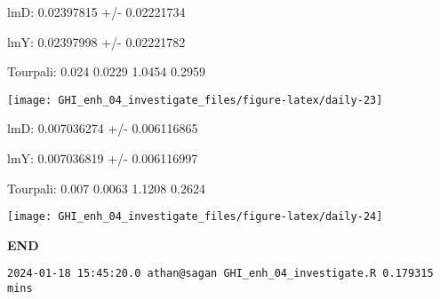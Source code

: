 \documentclass[
  10pt,
  a4paper,oneside]{article}
\begin{document}
lmD: 0.02397815 +/- 0.02221734

lmY: 0.02397998 +/- 0.02221782

Tourpali: 0.024 0.0229 1.0454 0.2959

\begin{center}\texttt{[image: GHI\_enh\_04\_investigate\_files/figure-latex/daily-23]} \end{center}

lmD: 0.007036274 +/- 0.006116865

lmY: 0.007036819 +/- 0.006116997

Tourpali: 0.007 0.0063 1.1208 0.2624

\begin{center}\texttt{[image: GHI\_enh\_04\_investigate\_files/figure-latex/daily-24]} \end{center}

\textbf{END}

\begin{verbatim}
2024-01-18 15:45:20.0 athan@sagan GHI_enh_04_investigate.R 0.179315 mins
\end{verbatim}
\end{document}
